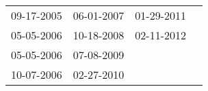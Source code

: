 \begin{supertabular}{llll}
 09-17-2005 &  06-01-2007 &  01-29-2011 \\
 05-05-2006 &  10-18-2008 &  02-11-2012 \\
 05-05-2006 &  07-08-2009 &             \\
 10-07-2006 &  02-27-2010 &             \\
\end{supertabular}
